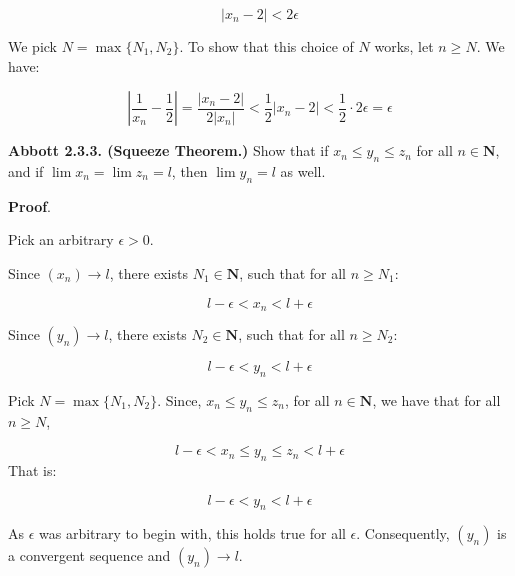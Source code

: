 \documentclass[10pt]{article}
\begin{document}
\begin{equation*}
|x_{n} -2|< 2\epsilon 
\end{equation*}


We pick $\displaystyle N=\max\{N_{1} ,N_{2}\}$. To show that this choice of $\displaystyle N$ works, let $\displaystyle n\geq N$. We have:


\begin{equation*}
\left| \frac{1}{x_{n}} -\frac{1}{2}\right| =\frac{|x_{n} -2|}{2|x_{n} |} < \frac{1}{2} |x_{n} -2|< \frac{1}{2} \cdot 2\epsilon =\epsilon 
\end{equation*}


\textbf{Abbott 2.3.3. (Squeeze Theorem.)} Show that if $\displaystyle x_{n} \leq y_{n} \leq z_{n}$ for all $\displaystyle n\in \mathbf{N}$, and if $\displaystyle \lim x_{n} =\lim z_{n} =l$, then $\displaystyle \lim y_{n} =l$ as well.



\textbf{Proof}.



Pick an arbitrary $\displaystyle \epsilon  >0$. 



Since $\displaystyle ( x_{n})\rightarrow l$, there exists $\displaystyle N_{1} \in \mathbf{N}$, such that for all $\displaystyle n\geq N_{1}$:


\begin{equation*}
l-\epsilon < x_{n} < l+\epsilon 
\end{equation*}


Since $\displaystyle ( y_{n})\rightarrow l$, there exists $\displaystyle N_{2} \in \mathbf{N}$, such that for all $\displaystyle n\geq N_{2}$:


\begin{equation*}
l-\epsilon < y_{n} < l+\epsilon 
\end{equation*}


Pick $\displaystyle N=\max\{N_{1} ,N_{2}\}$. Since, $\displaystyle x_{n} \leq y_{n} \leq z_{n}$, for all $\displaystyle n\in \mathbf{N}$, we have that for all $\displaystyle n\geq N$,


\begin{equation*}
l-\epsilon < x_{n} \leq y_{n} \leq z_{n} < l+\epsilon 
\end{equation*}
That is:


\begin{equation*}
l-\epsilon < y_{n} < l+\epsilon 
\end{equation*}


As $\displaystyle \epsilon $ was arbitrary to begin with, this holds true for all $\displaystyle \epsilon $. Consequently, $\displaystyle ( y_{n})$ is a convergent sequence and $\displaystyle ( y_{n})\rightarrow l$.
\end{document}

